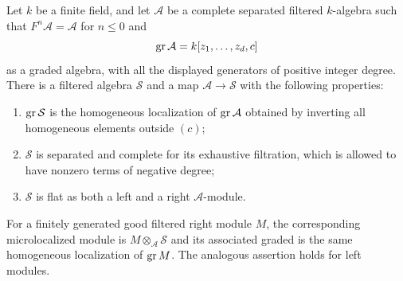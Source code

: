 \begin{lemma}
\label{obs:microlocal-flat}
Let $k$ be a finite field, and let $\mathcal A$ be a complete separated
filtered $k$-algebra such that $F^n\mathcal A=\mathcal A$ for $n\leq0$
and
\[
 \operatorname{gr}\mathcal A=k[z_1,\ldots,z_d,c]
\]
as a graded algebra, with all the displayed generators of positive
integer degree.  There is a filtered algebra $\mathcal S$ and a map
$\mathcal A\to\mathcal S$ with the following properties:
\begin{enumerate}
 \item $\operatorname{gr}\mathcal S$ is the homogeneous localization of
 $\operatorname{gr}\mathcal A$ obtained by inverting all homogeneous elements outside
 $(c)$;
 \item $\mathcal S$ is separated and complete for its exhaustive
 filtration, which is allowed to have nonzero terms of negative degree;
 \item $\mathcal S$ is flat as both a left and a right
 $\mathcal A$-module.
\end{enumerate}
For a finitely generated good filtered right module $M$, the corresponding
microlocalized module is $M\otimes_{\mathcal A}\mathcal S$ and its
associated graded is the same homogeneous localization of $\operatorname{gr} M$.
The analogous assertion holds for left modules.
\end{lemma}

